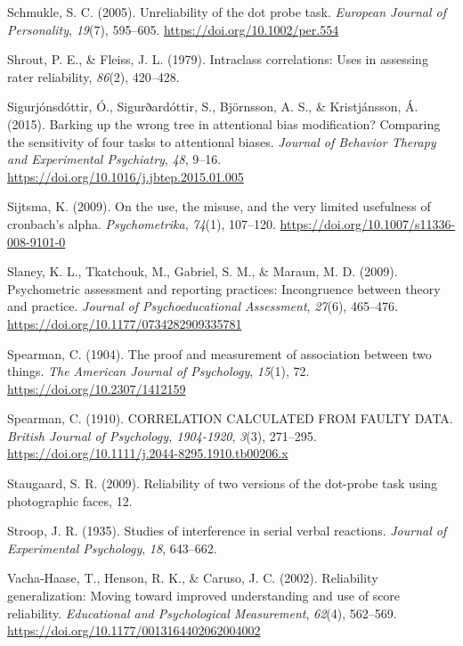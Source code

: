 \documentclass[english,,man,floatsintext]{apa6}
\begin{document}
\leavevmode\hypertarget{ref-schmukle_unreliability_2005}{}%
Schmukle, S. C. (2005). Unreliability of the dot probe task. \emph{European Journal of Personality}, \emph{19}(7), 595--605. \url{https://doi.org/10.1002/per.554}

\leavevmode\hypertarget{ref-shrout_intraclass_1979}{}%
Shrout, P. E., \& Fleiss, J. L. (1979). Intraclass correlations: Uses in assessing rater reliability, \emph{86}(2), 420--428.

\leavevmode\hypertarget{ref-sigurjonsdottir_barking_2015}{}%
Sigurjónsdóttir, Ó., Sigurðardóttir, S., Björnsson, A. S., \& Kristjánsson, Á. (2015). Barking up the wrong tree in attentional bias modification? Comparing the sensitivity of four tasks to attentional biases. \emph{Journal of Behavior Therapy and Experimental Psychiatry}, \emph{48}, 9--16. \url{https://doi.org/10.1016/j.jbtep.2015.01.005}

\leavevmode\hypertarget{ref-sijtsma_use_2009}{}%
Sijtsma, K. (2009). On the use, the misuse, and the very limited usefulness of cronbach's alpha. \emph{Psychometrika}, \emph{74}(1), 107--120. \url{https://doi.org/10.1007/s11336-008-9101-0}

\leavevmode\hypertarget{ref-slaney_psychometric_2009}{}%
Slaney, K. L., Tkatchouk, M., Gabriel, S. M., \& Maraun, M. D. (2009). Psychometric assessment and reporting practices: Incongruence between theory and practice. \emph{Journal of Psychoeducational Assessment}, \emph{27}(6), 465--476. \url{https://doi.org/10.1177/0734282909335781}

\leavevmode\hypertarget{ref-spearman_proof_1904}{}%
Spearman, C. (1904). The proof and measurement of association between two things. \emph{The American Journal of Psychology}, \emph{15}(1), 72. \url{https://doi.org/10.2307/1412159}

\leavevmode\hypertarget{ref-spearman_correlation_1910}{}%
Spearman, C. (1910). CORRELATION CALCULATED FROM FAULTY DATA. \emph{British Journal of Psychology, 1904-1920}, \emph{3}(3), 271--295. \url{https://doi.org/10.1111/j.2044-8295.1910.tb00206.x}

\leavevmode\hypertarget{ref-staugaard_reliability_2009}{}%
Staugaard, S. R. (2009). Reliability of two versions of the dot-probe task using photographic faces, 12.

\leavevmode\hypertarget{ref-stroop_studies_1935}{}%
Stroop, J. R. (1935). Studies of interference in serial verbal reactions. \emph{Journal of Experimental Psychology}, \emph{18}, 643--662.

\leavevmode\hypertarget{ref-vacha-haase_reliability_2002}{}%
Vacha-Haase, T., Henson, R. K., \& Caruso, J. C. (2002). Reliability generalization: Moving toward improved understanding and use of score reliability. \emph{Educational and Psychological Measurement}, \emph{62}(4), 562--569. \url{https://doi.org/10.1177/0013164402062004002}
\end{document}

